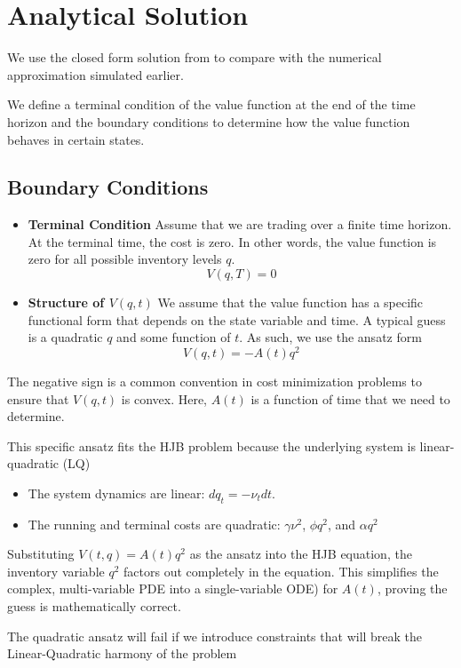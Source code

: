 \section*{Analytical Solution}
We use the closed form solution from \cite{online:orderbook-optimal-liquidation} to compare with the numerical approximation simulated earlier.

We define a terminal condition of the value function at the end of the time horizon and the boundary conditions to determine how the value function behaves in certain states.

\subsection*{Boundary Conditions}
\begin{itemize}
\item \textbf{Terminal Condition}
Assume that we are trading over a finite time horizon. At the terminal time, the cost is zero. In other words, the value function is zero for all possible inventory levels $q$.
$$V(q, T) = 0$$

\item \textbf{Structure of $V(q,t)$}
We assume that the value function has a specific functional form that depends on the state variable and time. A typical guess is a quadratic $q$ and some function of $t$. As such, we use the ansatz form
$$V(q, t) = -A(t) q^2$$
\end{itemize}

The negative sign is a common convention in cost minimization problems to ensure that $V(q,t)$ is convex. Here, $A(t)$ is a function of time that we need to determine.

This specific ansatz fits the HJB problem because the underlying system is linear-quadratic (LQ)
\begin{itemize}
\item The system dynamics are linear: $dq_t = -\nu_t dt$.
\item The running and terminal costs are quadratic: $\gamma \nu^2$, $\phi q^2$, and $\alpha q^2$
\end{itemize}

Substituting $V(t,q) = A(t)q^2$ as the ansatz into the HJB equation, the inventory variable $q^{2}$ factors out completely in the equation. This simplifies the complex, multi-variable PDE into a single-variable ODE) for $A(t)$, proving the guess is mathematically correct.

The quadratic ansatz will fail if we introduce constraints that will break the Linear-Quadratic harmony of the problem

